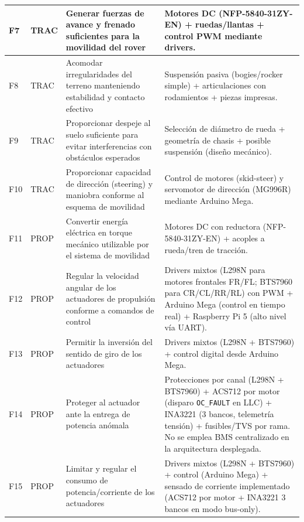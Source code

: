 \begin{landscape}
\begin{longtable}{|p{0.9cm}|p{2.0cm}|p{6.8cm}|p{9.2cm}|}
F7 & TRAC & Generar fuerzas de avance y frenado suficientes para la movilidad del rover &
Motores DC (NFP-5840-31ZY-EN) + ruedas/llantas + control PWM mediante drivers.\\ \hline

F8 & TRAC & Acomodar irregularidades del terreno manteniendo estabilidad y contacto efectivo &
Suspensión pasiva (bogies/rocker simple) + articulaciones con rodamientos + piezas impresas.\\ \hline

F9 & TRAC & Proporcionar despeje al suelo suficiente para evitar interferencias con obstáculos esperados &
Selección de diámetro de rueda + geometría de chasis + posible suspensión (diseño mecánico).\\ \hline

F10 & TRAC & Proporcionar capacidad de dirección (steering) y maniobra conforme al esquema de movilidad &
Control de motores (skid-steer) y servomotor de dirección (MG996R) mediante Arduino Mega.\\ \hline

F11 & PROP & Convertir energía eléctrica en torque mecánico utilizable por el sistema de movilidad &
Motores DC con reductora (NFP-5840-31ZY-EN) + acoples a rueda/tren de tracción.\\ \hline

F12 & PROP & Regular la velocidad angular de los actuadores de propulsión conforme a comandos de control &
Drivers mixtos (L298N para motores frontales FR/FL; BTS7960 para CR/CL/RR/RL) con PWM + Arduino Mega (control en tiempo real) + Raspberry Pi 5 (alto nivel vía UART).\\ \hline

F13 & PROP & Permitir la inversión del sentido de giro de los actuadores &
Drivers mixtos (L298N + BTS7960) + control digital desde Arduino Mega.\\ \hline

F14 & PROP & Proteger al actuador ante la entrega de potencia anómala &
Protecciones por canal (L298N + BTS7960) + ACS712 por motor (disparo \texttt{OC\_FAULT} en LLC) + INA3221 (3 bancos, telemetría tensión) + fusibles/TVS por rama. No se emplea BMS centralizado en la arquitectura desplegada.\\ \hline

F15 & PROP & Limitar y regular el consumo de potencia/corriente de los actuadores &
Drivers mixtos (L298N + BTS7960) + control (Arduino Mega) + sensado de corriente implementado (ACS712 por motor + INA3221 3 bancos en modo bus-only).\\ \hline


\end{longtable}
\end{landscape}
